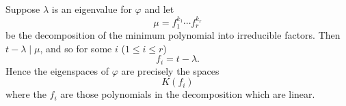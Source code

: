 Suppose $\lambda$ is an eigenvalue for $\varphi$ and let
$$\mu = f_1^{k_1} \cdots f_r^{k_r}$$
be the decomposition of the minimum polynomial into irreducible factors. Then $t - \lambda \mid \mu$, and so for some $i$ ($1 \leq i \leq r$)
$$f_i = t - \lambda.$$
Hence the eigenspaces of $\varphi$ are precisely the spaces
$$K(f_i)$$
where the $f_i$ are those polynomials in the decomposition which are linear.
